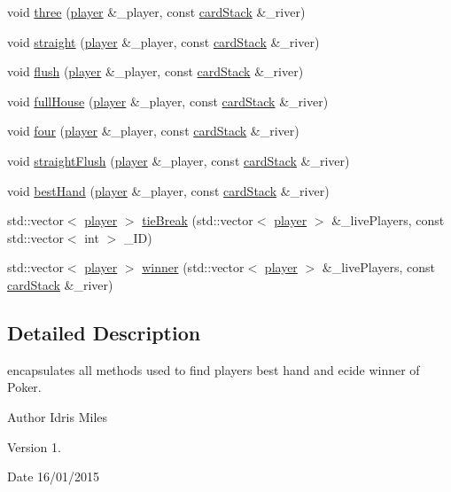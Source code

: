 \begin{DoxyCompactItemize}
\item 
void \hyperlink{namespacehands_ad1d6dbad028c83769dca51fc62d65969}{three} (\hyperlink{classplayer}{player} \&\-\_\-player, const \hyperlink{classcardStack}{card\-Stack} \&\-\_\-river)
\item 
void \hyperlink{namespacehands_a049d77b8152d001be0df8f3d733d9e71}{straight} (\hyperlink{classplayer}{player} \&\-\_\-player, const \hyperlink{classcardStack}{card\-Stack} \&\-\_\-river)
\item 
void \hyperlink{namespacehands_a96b3a32f0fd760e7542148042b01697f}{flush} (\hyperlink{classplayer}{player} \&\-\_\-player, const \hyperlink{classcardStack}{card\-Stack} \&\-\_\-river)
\item 
void \hyperlink{namespacehands_ad07dc24f489e0883880047c448bc8237}{full\-House} (\hyperlink{classplayer}{player} \&\-\_\-player, const \hyperlink{classcardStack}{card\-Stack} \&\-\_\-river)
\item 
void \hyperlink{namespacehands_aa2871b87380a2a7340e800a47c919cc5}{four} (\hyperlink{classplayer}{player} \&\-\_\-player, const \hyperlink{classcardStack}{card\-Stack} \&\-\_\-river)
\item 
void \hyperlink{namespacehands_a42bd5b3d774d397c4ce67ba39af4af36}{straight\-Flush} (\hyperlink{classplayer}{player} \&\-\_\-player, const \hyperlink{classcardStack}{card\-Stack} \&\-\_\-river)
\item 
void \hyperlink{namespacehands_abf4446a1a0ec86dd9367c5372847b76f}{best\-Hand} (\hyperlink{classplayer}{player} \&\-\_\-player, const \hyperlink{classcardStack}{card\-Stack} \&\-\_\-river)
\item 
std\-::vector$<$ \hyperlink{classplayer}{player} $>$ \hyperlink{namespacehands_aa5c02c0f440cbd185e7fc2280ead6072}{tie\-Break} (std\-::vector$<$ \hyperlink{classplayer}{player} $>$ \&\-\_\-live\-Players, const std\-::vector$<$ int $>$ \-\_\-\-I\-D)
\item 
std\-::vector$<$ \hyperlink{classplayer}{player} $>$ \hyperlink{namespacehands_a058800342cbc5d20baf94496f5565019}{winner} (std\-::vector$<$ \hyperlink{classplayer}{player} $>$ \&\-\_\-live\-Players, const \hyperlink{classcardStack}{card\-Stack} \&\-\_\-river)
\end{DoxyCompactItemize}


\subsection{Detailed Description}
encapsulates all methods used to find players best hand and ecide winner of Poker. \begin{DoxyAuthor}{Author}
Idris Miles 
\end{DoxyAuthor}
\begin{DoxyVersion}{Version}
1. 
\end{DoxyVersion}
\begin{DoxyDate}{Date}
16/01/2015 
\end{DoxyDate}


